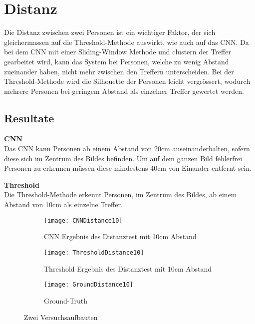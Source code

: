 \section{Distanz}
\label{sec:distanz}

Die Distanz zwischen zwei Personen ist ein wichtiger Faktor, der sich gleichermassen auf die Threshold-Methode auswirkt, wie auch auf das \gls{CNN}. Da bei dem \gls{CNN} mit einer Sliding-Window Methode und clustern der Treffer gearbeitet wird, kann das System bei Personen, welche zu wenig Abstand zueinander haben, nicht mehr zwischen den Treffern unterscheiden. Bei der Threshold-Methode wird die Silhouette der Personen leicht vergrössert, wodurch mehrere Personen bei geringem Abstand als einzelner Treffer gewertet werden.

\subsection{Resultate}

\textbf{\gls{CNN}}\\
Das \gls{CNN} kann Personen ab einem Abstand von 20cm auseinanderhalten, sofern diese sich im Zentrum des Bildes befinden. Um auf dem ganzen Bild fehlerfrei Personen zu erkennen müssen diese mindestens 40cm von Einander entfernt sein.

\textbf{Threshold}\\
Die Threshold-Methode erkennt Personen, im Zentrum des Bildes, ab einem Abstand von 10cm als einzelne Treffer. 

\begin{figure}[h!]
	\begin{subfigure}{.5\linewidth}
		\texttt{[image: CNNDistance10]}
		\caption{CNN Ergebnis des Distanztest mit 10cm Abstand}
		\label{fig:versuchaufbaunmr1}
	\end{subfigure}\hfill%
	\begin{subfigure}{.5\linewidth}
		\centering
		\texttt{[image: ThresholdDistance10]}
		\caption{Threshold Ergebnis des Distanztest mit 10cm Abstand}
		\label{fig:versuchaufbaunmr7}
	\end{subfigure}
	\begin{subfigure}{.8\linewidth}
		\centering
		\texttt{[image: GroundDistance10]}
		\caption{Ground-Truth}
		\label{fig:versuchaufbaunmr7}
	\end{subfigure}
	\caption{Zwei Versuchsaufbauten}
	\label{fig:versuchsaufbauten}
\end{figure}

